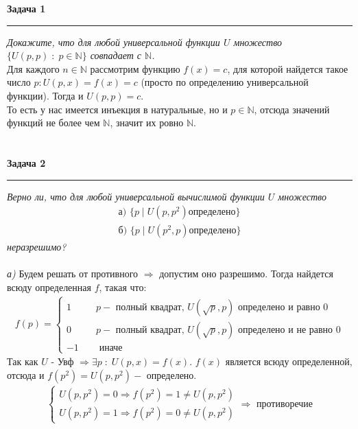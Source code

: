 \documentclass[a4paper,11pt]{article}
\begin{document}
\textbf{\large Задача 1}
\medskip\hrule\medskip
\textit{Докажите, что для любой универсальной функции $ U $ множество $ \{U(p, p) \; : \; p \in \mathbb{N} \} $ совпадает с $ \mathbb{N} $.}  \\[16pt]
Для каждого $ n \in \mathbb{N} $ рассмотрим функцию  $ f(x) = c $, для которой найдется такое число $ p : U(p, x) = f(x) = c $ (просто по определению универсальной функции). Тогда и $ U(p, p) = c $. \\[3pt]
То есть у нас имеется инъекция в натуральные, но и $ p \in \mathbb{N} $, отсюда значений функций  не  более чем $ \mathbb{N} $, значит их ровно $ \mathbb{N} $. \\ \\ \\




\textbf{\large Задача 2}
\medskip\hrule\medskip
\textit{Верно ли, что для любой универсальной вычислимой функции $ U $ множество}
\begin{align*}
\textit{а) } \{p \; | \; U(p, p^2) определено\} \\
\text{б) } \{p \; | \; U(p^2, p) определено\}
\end{align*}
\textit{неразрешимо?} \\ \\

\textsl{а)} Будем решать от противного $ \Rightarrow $  допустим оно разрешимо. Тогда найдется всюду определенная $ f $, такая что:
\begin{align*}
f(p) = 
\begin{cases}
1 \quad & p - \text{ полный квадрат, }U(\sqrt{p}, p)  \text{ определено и равно 0}\\
0 \quad & p - \text{ полный квадрат, }U(\sqrt{p}, p)  \text{ определено и не равно 0}\\
-1 \quad & \text{  иначе }
\end{cases}
\end{align*}
Так как $ U $ - Увф $ \Rightarrow \exists p \; : \; U(p, x) = f(x) $. $ f(x) $ является всюду определенной, отсюда и $ f(p^2) = U(p, p^2) - $ определено. 
\begin{align*}
\begin{cases}
U(p, p^2) = 0 \Rightarrow f(p^2) = 1 \neq U(p, p^2) \\
U(p, p^2) = 1 \Rightarrow f(p^2) = 0 \neq U(p, p^2)
\end{cases}
\Rightarrow \text{ противоречие}
\end{align*}
\end{document}
